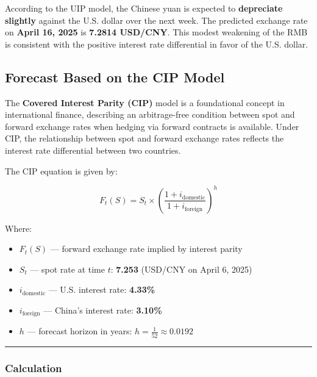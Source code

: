 \documentclass[
]{article}
\providecommand{\tightlist}{%
  \setlength{\itemsep}{0pt}\setlength{\parskip}{0pt}}
\begin{document}
According to the UIP model, the Chinese yuan is expected to
\textbf{depreciate slightly} against the U.S. dollar over the next week.
The predicted exchange rate on \textbf{April 16, 2025} is \textbf{7.2814
USD/CNY}. This modest weakening of the RMB is consistent with the
positive interest rate differential in favor of the U.S. dollar.

\subsection{Forecast Based on the CIP
Model}\label{forecast-based-on-the-cip-model}

The \textbf{Covered Interest Parity (CIP)} model is a foundational
concept in international finance, describing an arbitrage-free condition
between spot and forward exchange rates when hedging via forward
contracts is available. Under CIP, the relationship between spot and
forward exchange rates reflects the interest rate differential between
two countries.

The CIP equation is given by:

\[
F_{t}(S) = S_t \times \left( \frac{1 + i_{\text{domestic}}}{1 + i_{\text{foreign}}} \right)^h
\]

Where:

\begin{itemize}
\tightlist
\item
  \(F_t(S)\) --- forward exchange rate implied by interest parity\\
\item
  \(S_t\) --- spot rate at time \(t\): \textbf{7.253} (USD/CNY on April
  6, 2025)\\
\item
  \(i_{\text{domestic}}\) --- U.S. interest rate: \textbf{4.33\%}\\
\item
  \(i_{\text{foreign}}\) --- China's interest rate: \textbf{3.10\%}\\
\item
  \(h\) --- forecast horizon in years:
  \(h = \frac{1}{52} \approx 0.0192\)
\end{itemize}

\begin{center}\rule{0.5\linewidth}{0.5pt}\end{center}

\subsubsection{Calculation}\label{calculation-1}
\end{document}
